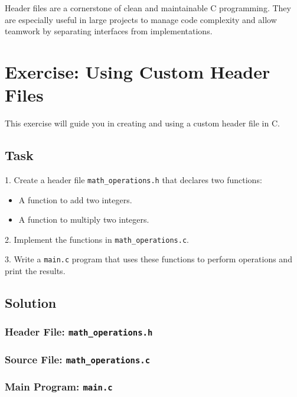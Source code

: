 Header files are a cornerstone of clean and maintainable C programming. They are especially useful in large projects to manage code complexity and allow teamwork by separating interfaces from implementations.

\section{Exercise: Using Custom Header Files}

This exercise will guide you in creating and using a custom header file in C.

\subsection{Task}
1. Create a header file \texttt{math\_operations.h} that declares two functions:
\begin{itemize}
	\item A function to add two integers.
	\item A function to multiply two integers.
\end{itemize}

2. Implement the functions in \texttt{math\_operations.c}.

3. Write a \texttt{main.c} program that uses these functions to perform operations and print the results.

\subsection{Solution}

\subsubsection{Header File: \texttt{math\_operations.h}}


\subsubsection{Source File: \texttt{math\_operations.c}}


\subsubsection{Main Program: \texttt{main.c}}


